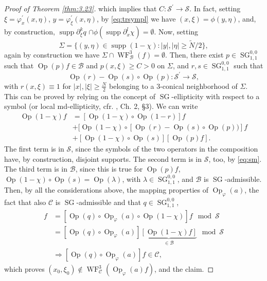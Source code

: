 \documentclass[12pt,a4paper,reqno]{amsart}
\numberwithin{equation}{section}
\numberwithin{thm}{section}
\theoremstyle{definition}
\theoremstyle{remark}
\begin{document}
\begin{proof}[Proof of Theorem \ref{thm:3.23}]
				which implies that $C\colon{{\mathscr S}}^\prime\to{{\mathscr S}}$. In fact, setting $\xi=\varphi^\prime_x(x,\eta)$,
		$y=\varphi^\prime_\xi(x,\eta)$, by \eqref{eq:trsympl} we have $(x,\xi)=\phi(y,\eta)$,
		and, by construction, ${\operatorname{supp}}\partial^k_\xi q$ $\cap\phi({\operatorname{supp}}\partial^l_x\chi)=\emptyset$.
		Now, setting
				\[
			\Sigma=\{(y,\eta)\in{\operatorname{supp}}(1-\chi)\colon|y|,|\eta|\ge \widetilde{N}/2\},
		\]
				again by construction we have $\Sigma\cap{\operatorname{WF}}^3_{{\mathcal B}}(f)=\emptyset$. Then, there exist
		$p\in{\operatorname{SG}}^{0,0}_{1,1}$ such that ${\operatorname{Op}}(p)f\in{{\mathcal B}}$ and $p(x,\xi)\ge C >0$ on $\Sigma$, and
		$r,s\in{\operatorname{SG}}^{0,0}_{1,1}$ such that
				\begin{equation}\label{eq:sm}
			{\operatorname{Op}}(r)-{\operatorname{Op}}(s)\circ{\operatorname{Op}}(p)\colon{{\mathscr S}}^\prime\to{{\mathscr S}},
		\end{equation}
				with $r(x,\xi)\equiv1$ for $|x|,|\xi|\ge\frac{N}{2}$ belonging
		to a $3$-conical neighborhood of $\Sigma$. This can be proved by relying
		on the concept of ${\operatorname{SG}}$-ellipticity with respect to a symbol (or local md-ellipticity, cfr. \cite{Co}, Ch. 2, \S 3). 
		We can write
				\begin{align*}
			{\operatorname{Op}}(1-\chi)f&=[{\operatorname{Op}}(1-\chi)\circ{\operatorname{Op}}(1-r)]f
			\\
			&+[{\operatorname{Op}}(1-\chi)\circ[{\operatorname{Op}}(r)-{\operatorname{Op}}(s)\circ{\operatorname{Op}}(p))]f
			\\
			&+[{\operatorname{Op}}(1-\chi)\circ{\operatorname{Op}}(s)][{\operatorname{Op}}(p)f].
		\end{align*}
				The first term is in ${{\mathscr S}}$, since the symbols of the two operators in the composition
		have, by construction, disjoint supports. The second term is in ${{\mathscr S}}$, too,
		by \eqref{eq:sm}. The third term is in ${{\mathcal B}}$, since this is true for ${\operatorname{Op}}(p)f$,
		${\operatorname{Op}}(1-\chi)\circ{\operatorname{Op}}(s)={\operatorname{Op}}(\lambda)$, with $\lambda\in{\operatorname{SG}}^{0,0}_{1,1}$,
		and ${{\mathcal B}}$ is ${\operatorname{SG}}$-admissible. Then, by all the considerations above,
		the mapping properties of ${\operatorname{Op}}_\varphi(a)$,
		the fact that also ${{\mathcal C}}$ is ${\operatorname{SG}}$-admissible
		and that $q\in{\operatorname{SG}}^{0,0}_{1,1}$,
				\begin{align*}
			[{\operatorname{Op}}(q)\circ{\operatorname{Op}}_\varphi(a)]f&=[{\operatorname{Op}}(q)\circ{\operatorname{Op}}_\varphi(a)\circ{\operatorname{Op}}(1-\chi)]f\mod{{\mathscr S}}
			\\
			&=[{\operatorname{Op}}(q)\circ{\operatorname{Op}}_\varphi(a)]\underbrace{[{\operatorname{Op}}(1-\chi)f]}_{\in{{\mathcal B}}}\mod{{\mathscr S}}
			\\
			&\Rightarrow [{\operatorname{Op}}(q)\circ{\operatorname{Op}}_\varphi(a)]f\in{{\mathcal C}},
		\end{align*}
				which proves $(x_0,\xi_0)\notin {\operatorname{WF}}^3_{{\mathcal C}}({\operatorname{Op}}_\varphi(a)f)$, and the claim.
		

\end{proof}
\end{document}
